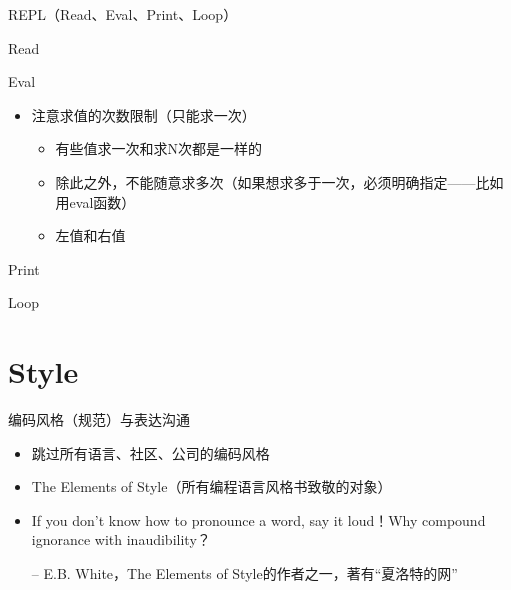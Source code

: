 \documentclass[presentation,dvipdfmx,CJKbookmarks]{beamer}
\begin{document}
\begin{CJK*}{UTF8}{simsun}
\begin{frame}[label={sec:org2cd499b}]{REPL（Read、Eval、Print、Loop）}
\begin{block}{Read}
\end{block}
\begin{block}{Eval}
\begin{itemize}
\item 注意求值的次数限制（只能求一次）
\begin{itemize}
\item 有些值求一次和求\thinspace N\thinspace 次都是一样的
\item 除此之外，不能随意求多次（如果想求多于一次，必须明确指定——比如用\thinspace eval\thinspace 函数）
\item 左值和右值
\end{itemize}
\end{itemize}
\end{block}

\begin{block}{Print}
\end{block}
\begin{block}{Loop}
\end{block}
\end{frame}

\section{Style}
\label{sec:org15fc47d}

\begin{frame}[fragile,label={sec:org36d8634}]{编码风格（规范）与表达沟通}
 \begin{itemize}
\item 跳过所有语言、社区、公司的编码风格
\item The Elements of Style（所有编程语言风格书致敬的对象）
\item If you don't know how to pronounce a word, say it loud！Why compound ignorance with inaudibility？

-- E.B. White，The Elements of Style\thinspace 的作者之一，著有“夏洛特的网”


\end{itemize}
\end{frame}
\end{CJK*}
\end{document}
